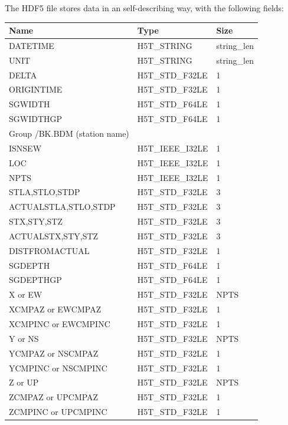 \documentclass[11pt]{report}
\begin{document}
{The HDF5 file stores data in an self-describing way, with the following fields:

\begin{center}
	\begin{tabular}{lll}\hline
		Name                 & Type             & Size        \\ \hline
		DATETIME             & H5T\_STRING      & string\_len \\ \hline
		UNIT                 & H5T\_STRING      & string\_len \\ \hline
		DELTA                & H5T\_STD\_F32LE  & 1           \\ \hline
		ORIGINTIME           & H5T\_STD\_F32LE  & 1           \\ \hline
		SGWIDTH              & H5T\_STD\_F64LE  & 1           \\ \hline
		SGWIDTHGP            & H5T\_STD\_F64LE  & 1           \\ \hline
		Group /BK.BDM (station name)                          \\ \hline
		ISNSEW               & H5T\_IEEE\_I32LE & 1           \\ \hline
		LOC                  & H5T\_IEEE\_I32LE & 1           \\ \hline
		NPTS                 & H5T\_IEEE\_I32LE & 1           \\ \hline
		STLA,STLO,STDP       & H5T\_STD\_F32LE  & 3           \\ \hline
		ACTUALSTLA,STLO,STDP & H5T\_STD\_F32LE  & 3           \\ \hline
		STX,STY,STZ          & H5T\_STD\_F32LE  & 3           \\ \hline
		ACTUALSTX,STY,STZ    & H5T\_STD\_F32LE  & 3           \\ \hline
		DISTFROMACTUAL       & H5T\_STD\_F32LE  & 1           \\ \hline
		SGDEPTH              & H5T\_STD\_F64LE  & 1           \\ \hline
		SGDEPTHGP            & H5T\_STD\_F64LE  & 1           \\ \hline
		X or EW              & H5T\_STD\_F32LE  & NPTS        \\ \hline
		XCMPAZ or EWCMPAZ    & H5T\_STD\_F32LE  & 1           \\ \hline
		XCMPINC or EWCMPINC  & H5T\_STD\_F32LE  & 1           \\ \hline
		Y or NS              & H5T\_STD\_F32LE  & NPTS        \\ \hline
		YCMPAZ or NSCMPAZ    & H5T\_STD\_F32LE  & 1           \\ \hline
		YCMPINC or NSCMPINC  & H5T\_STD\_F32LE  & 1           \\ \hline
		Z or UP              & H5T\_STD\_F32LE  & NPTS        \\ \hline
		ZCMPAZ or UPCMPAZ    & H5T\_STD\_F32LE  & 1           \\ \hline
		ZCMPINC or UPCMPINC  & H5T\_STD\_F32LE  & 1           \\ \hline
	\end{tabular}
\end{center}

}
\end{document}

